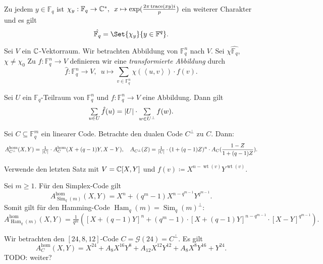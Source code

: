 \documentclass{cheat-sheet}
\newcommand{\F}{\mathbb{F}} %
\DeclareMathOperator{\wt}{wt} %
\newcommand{\scp}[2]{\left\langle #1, #2 \right\rangle} %
\newcommand{\homogen}{\text{hom}} %
\DeclareMathOperator{\Ham}{Ham} %
\DeclareMathOperator{\Sim}{Sim} %
\newcommand{\Golay}{\mathcal{G}} %
\DeclareMathOperator{\trace}{trace} %
\begin{document}
\begin{bem}
  Zu jedem $y \in \F_q$ ist $\chi_y : \F_q \to \C^*, \enspace x \mapsto \exp(\frac{2 \pi \trace(xy) i}{p})$ ein weiterer Charakter und es gilt
  \[ \hat{\F_q} = \Set{\chi_y}{y \in \F^q}. \]
\end{bem}

Sei $V$ ein $\mathbb{C}$-Vektorraum.
Wir betrachten Abbildung von $\F_q^n$ nach $V$.
Sei $\chi \hat{\F_q}$, $\chi \neq \chi_0$
Zu $f : \F_q^n \to V$ definieren wir eine \emph{transformierte Abbildung} durch
\[ \hat{f} : \F_q^n \to V, \enspace u \mapsto \sum_{v \in \F_q^n} \chi(\scp{u}{v}) \cdot f(v). \]

\begin{satz}
  Sei $U$ ein $\F_q$-Teilraum von $\F_q^n$ und $f : \F_q^n \to V$ eine Abbildung.
  Dann gilt
  \[
    \sum_{u \in U} \hat{f}(u) = \abs{U} \cdot \sum_{w \in U^\perp} f(w).
  \]
\end{satz}

\begin{satz}
  Sei $C \subseteq \F_q^m$ ein linearer Code.
  Betrachte den dualen Code $C^\perp$ zu $C$.
  Dann:
  \[
    A_{C^\perp}^\homogen(X, Y) = \tfrac{1}{\abs{C}} \cdot A_C^\homogen(X + (q-1)Y, X-Y), \quad
    A_{C^\perp}(Z) = \tfrac{1}{\abs{C}} \cdot (1 + (q-1) Z)^n \cdot A_C(\frac{1-Z}{1+(q-1)Z}).
  \]
\end{satz}

\begin{beweisidee}
  Verwende den letzten Satz mit $V = \mathbb{C}[X, Y]$ und $f(v) \coloneqq X^{n - \wt(v)} Y^{\wt(v)}$.
\end{beweisidee}

\begin{bsp}
  Sei $m \geq 1$.
  Für den Simplex-Code gilt
  \[
    A_{\Sim_q(m)}^\homogen (X, Y) = X^n + (q^m - 1) X^{n - q^{m-1}} Y^{q^{m-1}}.
  \]
  Somit gilt für den Hamming-Code $\Ham_q(m) = \Sim_q(m)^\perp$:
  \[
    A_{\Ham_q(m)}^\homogen (X, Y) = \tfrac{1}{q^m} \left( [X+(q-1)Y]^n + (q^m - 1) \cdot [X + (q-1) Y]^{n - q^{m-1}} \cdot [X-Y]^{q^{m-1}} \right).
  \]
\end{bsp}

\begin{bsp}
  Wir betrachten den $[24, 8, 12]$-Code $C = \Golay(24) = C^\perp$.
  Es gilt
  \[
    A_C^\homogen (X, Y) = X^{24} + A_8 X^{16} Y^8 + A_{12} X^{12} Y^{12} + A_8 X^8 Y^{16} + Y^{24}.
  \]
  TODO: weiter?
\end{bsp}

\end{document}
